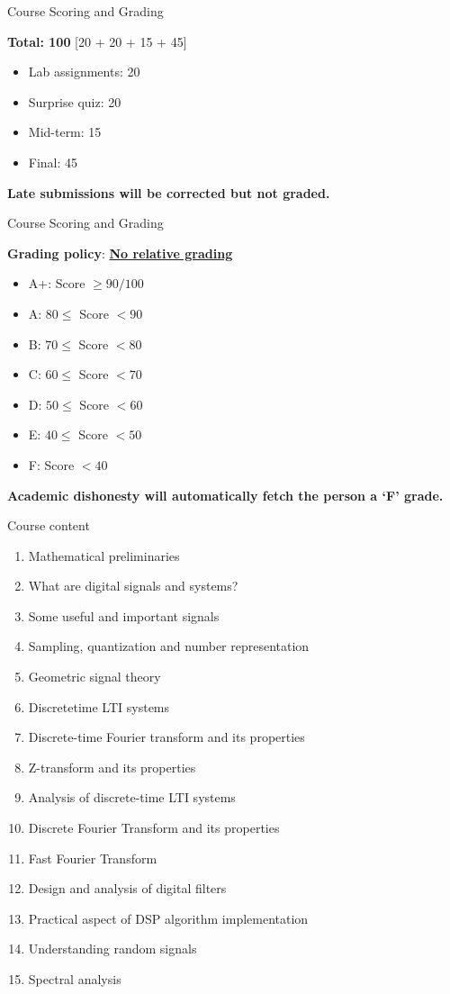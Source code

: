 \documentclass{beamer}
\begin{document}
\begin{frame}[t]{Course Scoring and Grading}

\textbf{Total: 100} [20 + 20 + 15 + 45]
\begin{itemize}
\item Lab assignments: 20
\item Surprise quiz: 20
\item Mid-term: 15
\item Final: 45
\end{itemize}
\textbf{Late submissions will be corrected but not graded.}
\end{frame}

\begin{frame}[t]{Course Scoring and Grading}

\textbf{Grading policy}: \textbf{\ul{No relative grading}}
\begin{itemize}
\item A+: Score $\geq 90/100$
\item A: $80 \leq$ Score $< 90$
\item B: $70 \leq$ Score $< 80$
\item C: $60 \leq$ Score $< 70$
\item D: $50 \leq$ Score $< 60$
\item E: $40 \leq$ Score $< 50$
\item F: Score $< 40$
\end{itemize}
\textbf{Academic dishonesty will automatically fetch the person a `F' grade.}
\end{frame}

\begin{frame}{Course content}
\begingroup
    \fontsize{9pt}{12pt}\selectfont
    \begin{enumerate}
    \item Mathematical preliminaries
    \item What are digital signals and systems?
    \item Some useful and important signals
    \item Sampling, quantization and number representation
    \item Geometric signal theory
    \item Discrete­time LTI systems
    \item Discrete­-time Fourier transform and its properties
    \item Z-­transform and its properties
    \item Analysis of discrete-­time LTI systems
    \item Discrete Fourier Transform and its properties
    \item Fast Fourier Transform
    \item Design and analysis of digital filters
    \item Practical aspect of DSP algorithm implementation
    \item Understanding random signals
    \item Spectral analysis
    \end{enumerate}  
\endgroup
\end{frame}
\end{document}
